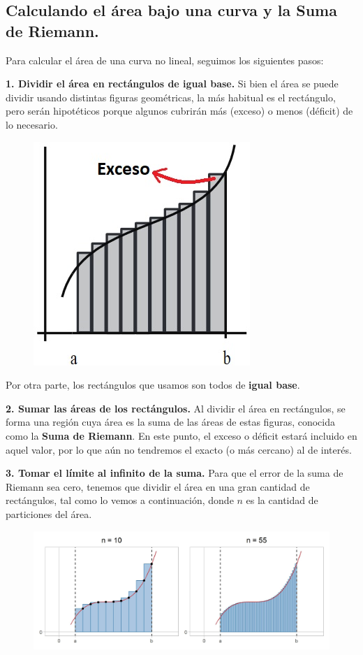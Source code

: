 \documentclass[12pt]{article}
\begin{document}
\subsection{Calculando el área bajo una curva y la Suma de Riemann.}

Para calcular el área de una curva no lineal, seguimos los siguientes pasos:

\textbf{1. Dividir el área en rectángulos de igual base.} \quad Si bien el área se puede dividir usando distintas figuras geométricas, la más habitual es el rectángulo, pero serán hipotéticos porque algunos cubrirán más (exceso) o menos (déficit) de lo necesario.

\begin{figure}[hbt!]
\centering
\includegraphics[scale=0.5]{img/area-under-curve-2.jpg}
\end{figure}

Por otra parte, los rectángulos que usamos son todos de \textbf{igual base}.

\textbf{2. Sumar las áreas de los rectángulos.} \quad Al dividir el área en rectángulos, se forma una región cuya área es la suma de las áreas de estas figuras, conocida como la \textbf{Suma de Riemann}. En este punto, el exceso o déficit estará incluido en aquel valor, por lo que aún no tendremos el exacto (o más cercano) al de interés.

\textbf{3. Tomar el límite al infinito de la suma.} \quad Para que el error de la suma de Riemann sea cero, tenemos que dividir el área en una gran cantidad de rectángulos, tal como lo vemos a continuación, donde $n$ es la cantidad de particiones del área.

\begin{figure}[hbt!]
\centering
\includegraphics[scale=0.7]{img/area-under-curve-3.jpg}
\end{figure}
\end{document}
